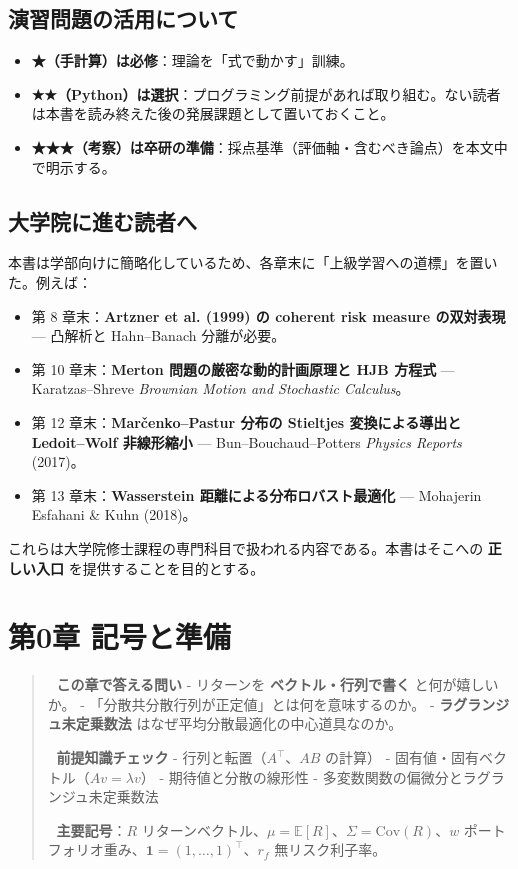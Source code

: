 \documentclass[11pt,a4paper]{report}
\begin{document}
\section{演習問題の活用について}

\begin{itemize}
\item \textbf{★（手計算）は必修}：理論を「式で動かす」訓練。
\item \textbf{★★（Python）は選択}：プログラミング前提があれば取り組む。ない読者は本書を読み終えた後の発展課題として置いておくこと。
\item \textbf{★★★（考察）は卒研の準備}：採点基準（評価軸・含むべき論点）を本文中で明示する。
\end{itemize}

\section{大学院に進む読者へ}

本書は学部向けに簡略化しているため、各章末に「上級学習への道標」を置いた。例えば：

\begin{itemize}
\item 第 8 章末：\textbf{Artzner et al. (1999) の coherent risk measure の双対表現} — 凸解析と Hahn–Banach 分離が必要。
\item 第 10 章末：\textbf{Merton 問題の厳密な動的計画原理と HJB 方程式} — Karatzas–Shreve \emph{Brownian Motion and Stochastic Calculus}。
\item 第 12 章末：\textbf{Marčenko–Pastur 分布の Stieltjes 変換による導出と Ledoit–Wolf 非線形縮小} — Bun–Bouchaud–Potters \emph{Physics Reports} (2017)。
\item 第 13 章末：\textbf{Wasserstein 距離による分布ロバスト最適化} — Mohajerin Esfahani \& Kuhn (2018)。
\end{itemize}

これらは大学院修士課程の専門科目で扱われる内容である。本書はそこへの \textbf{正しい入口} を提供することを目的とする。

\noindent\hrulefill

\chapter{第0章 記号と準備}

\begin{quote}
🎯 \textbf{この章で答える問い}
- リターンを \textbf{ベクトル・行列で書く} と何が嬉しいか。
- 「分散共分散行列が正定値」とは何を意味するのか。
- \textbf{ラグランジュ未定乗数法} はなぜ平均分散最適化の中心道具なのか。

📐 \textbf{前提知識チェック}
- 行列と転置（$A^\top$、$AB$ の計算）
- 固有値・固有ベクトル（$Av = \lambda v$）
- 期待値と分散の線形性
- 多変数関数の偏微分とラグランジュ未定乗数法

🔑 \textbf{主要記号}：$R$ リターンベクトル、$\mu = \mathbb{E}[R]$、$\Sigma = \mathrm{Cov}(R)$、$w$ ポートフォリオ重み、$\mathbf{1} = (1, \dots, 1)^\top$、$r_f$ 無リスク利子率。
\end{quote}
\end{document}
